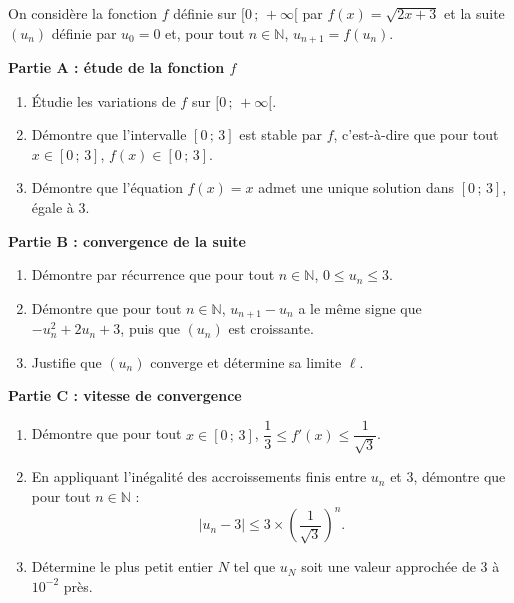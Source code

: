 \documentclass[11pt]{article}
\begin{document}
\begin{exercice}
On considère la fonction $f$ définie sur $[0\,;\,+\infty[$ par $f(x) = \sqrt{2x+3}$ et la suite $(u_n)$ définie par $u_0 = 0$ et, pour tout $n \in \mathbb{N}$, $u_{n+1} = f(u_n)$.

\textbf{Partie A : étude de la fonction $f$}
\begin{enumerate}
\item Étudie les variations de $f$ sur $[0\,;\,+\infty[$.
\item Démontre que l'intervalle $[0\,;\,3]$ est stable par $f$, c'est-à-dire que pour tout $x \in [0\,;\,3]$, $f(x) \in [0\,;\,3]$.
\item Démontre que l'équation $f(x) = x$ admet une unique solution dans $[0\,;\,3]$, égale à $3$.
\end{enumerate}

\textbf{Partie B : convergence de la suite}
\begin{enumerate}
\item Démontre par récurrence que pour tout $n \in \mathbb{N}$, $0 \leq u_n \leq 3$.
\item Démontre que pour tout $n \in \mathbb{N}$, $u_{n+1} - u_n$ a le même signe que $-u_n^2 + 2u_n + 3$, puis que $(u_n)$ est croissante.
\item Justifie que $(u_n)$ converge et détermine sa limite $\ell$.
\end{enumerate}

\textbf{Partie C : vitesse de convergence}
\begin{enumerate}
\item Démontre que pour tout $x \in [0\,;\,3]$, $\dfrac{1}{3} \leq f'(x) \leq \dfrac{1}{\sqrt{3}}$.
\item En appliquant l'inégalité des accroissements finis entre $u_n$ et $3$, démontre que pour tout $n \in \mathbb{N}$ :
\[ |u_n - 3| \leq 3 \times \left(\frac{1}{\sqrt{3}}\right)^n. \]
\item Détermine le plus petit entier $N$ tel que $u_N$ soit une valeur approchée de $3$ à $10^{-2}$ près.
\end{enumerate}
\end{exercice}
\end{document}
